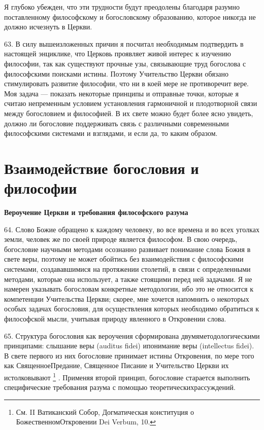 \documentclass[a5paper,10pt]{article}
\begin{document}
Я глубоко убежден, что эти трудности будут преодолены благодаря разумно
поставленному философскому и богословскому образованию, которое никогда не
должно исчезнуть в Церкви.

63. В силу вышеизложенных причин я посчитал необходимым подтвердить в настоящей
энциклике, что Церковь проявляет живой интерес к изучению философии, так как
существуют прочные узы, связывающие труд богослова с философскими поисками
истины. Поэтому Учительство Церкви обязано стимулировать развитие философии,
что ни в коей мере не противоречит вере. Моя задача — показать некоторые
принципы и отправные точки, которые я считаю непременным условием установления
гармоничной и плодотворной связи между богословием и философией. В их свете
можно будет более ясно увидеть, должно ли богословие поддерживать связь с
различными современными философскими системами и взглядами, и если да, то каким
образом.

\section{Взаимодействие богословия и философии}

\textbf{Вероучение Церкви и требования философского разума}

64. Слово Божие обращено к каждому человеку, во все времена и во всех уголках
земли, человек же по своей природе является философом. В свою очередь,
богословие научными методами осознанно развивает понимание слова Божия в свете
веры, поэтому не может обойтись без взаимодействия с философскими системами,
создававшимися на протяжении столетий, в связи с определенными методами,
которые она использует, а также стоящими перед ней задачами. Я не намерен
указывать богословам конкретные методологии, ибо это не относится к компетенции
Учительства Церкви; скорее, мне хочется напомнить о некоторых особых задачах
богословия, для осуществления которых необходимо обратиться к философской
мысли, учитывая природу явленного в Откровении слова.

65. Структура богословия как вероучения сформирована двумяметодологическими
принципами: слышание веры (auditus fidei) ипонимание веры (intellectus fidei).
В свете первого из них богословие принимает истины Откровения, по мере того как
СвященноеПредание, Священное Писание и Учительство Церкви их истолковывают
\footnote{См. II Ватиканский Собор, Догматическая конституция о
БожественномОткровении Dei Verbum, 10.} .  Применяя второй принцип, богословие
старается выполнить специфические требования разума с помощью
теоретическихрассуждений.
\end{document}
